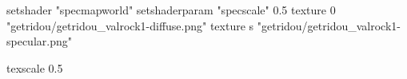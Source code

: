 setshader "specmapworld"
setshaderparam "specscale" 0.5
texture 0 "getridou/getridou_valrock1-diffuse.png"
texture s "getridou/getridou_valrock1-specular.png"

texscale 0.5